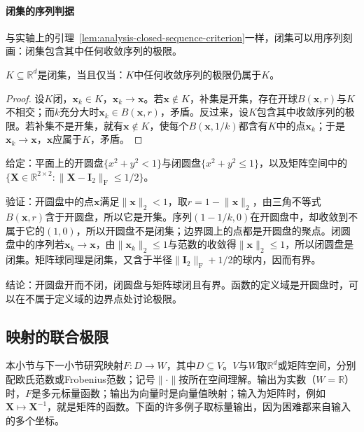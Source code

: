 \paragraph{闭集的序列判据}
与实轴上的引理~\ref{lem:analysis-closed-sequence-criterion}一样，闭集可以用序列刻画：闭集包含其中任何收敛序列的极限。
\begin{lemma}[闭集的序列判据]
\label{lem:multivariable-closed-sequence}
$K\subseteq\mathbb R^d$是闭集，当且仅当：$K$中任何收敛序列的极限仍属于$K$。
\end{lemma}
\begin{proof}
设$K$闭，$\bm x_k\in K$，$\bm x_k\to\bm x$。若$\bm x\notin K$，补集是开集，存在开球$B(\bm x,r)$与$K$不相交；而$k$充分大时$\bm x_k\in B(\bm x,r)$，矛盾。反过来，设$K$包含其中收敛序列的极限。若补集不是开集，就有$\bm x\notin K$，使每个$B(\bm x,1/k)$都含有$K$中的点$\bm x_k$；于是$\bm x_k\to\bm x$，$\bm x$应属于$K$，矛盾。
\end{proof}
\begin{example}[圆盘与矩阵球]
\label{ex:multivariable-open-closed-sets}
给定：平面上的开圆盘$\{x^2+y^2<1\}$与闭圆盘$\{x^2+y^2\leq1\}$，以及矩阵空间中的$\{\bm X\in\mathbb R^{2\times2}:\lVert\bm X-\bm I_2\rVert_{\mathrm F}\leq1/2\}$。

验证：开圆盘中的点$\bm x$满足$\lVert\bm x\rVert_2<1$，取$r=1-\lVert\bm x\rVert_2$，由三角不等式$B(\bm x,r)$含于开圆盘，所以它是开集。序列$(1-1/k,0)$在开圆盘中，却收敛到不属于它的$(1,0)$，所以开圆盘不是闭集；边界圆上的点都是开圆盘的聚点。闭圆盘中的序列若$\bm x_k\to\bm x$，由$\lVert\bm x_k\rVert_2\leq1$与范数的收敛得$\lVert\bm x\rVert_2\leq1$，所以闭圆盘是闭集。矩阵球同理是闭集，又含于半径$\lVert\bm I_2\rVert_{\mathrm F}+1/2$的球内，因而有界。

结论：开圆盘开而不闭，闭圆盘与矩阵球闭且有界。函数的定义域是开圆盘时，可以在不属于定义域的边界点处讨论极限。
\end{example}

\subsection{映射的联合极限}
\label{sec:multivariable-joint-limit-section}

本小节与下一小节研究映射$F:D\to W$，其中$D\subseteq V$。$V$与$W$取$\mathbb R^d$或矩阵空间，分别配欧氏范数或Frobenius范数；记号$\lVert\cdot\rVert$按所在空间理解。输出为实数（$W=\mathbb R$）时，$F$是多元标量函数；输出为向量时是向量值映射；输入为矩阵时，例如$\bm X\mapsto\bm X^{-1}$，就是矩阵的函数。下面的许多例子取标量输出，因为困难都来自输入的多个坐标。

